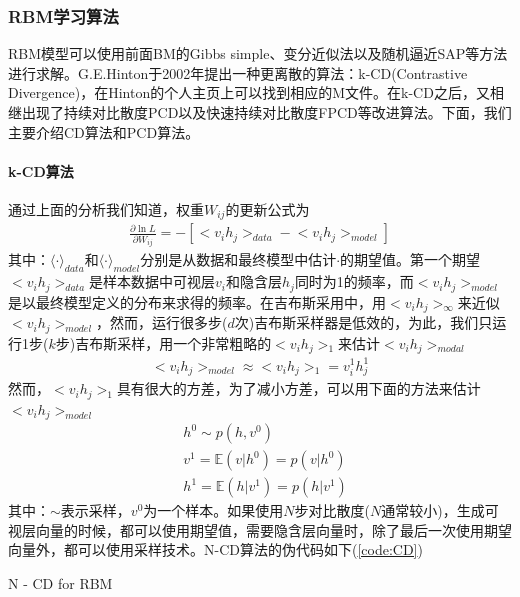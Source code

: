 {        \subsubsection{RBM学习算法}
            \par
            RBM模型可以使用前面BM的Gibbs simple、变分近似法以及随机逼近SAP等方法进行求解。G.E.Hinton于2002年提出一种更离散的算法：k-CD(Contrastive Divergence)，在Hinton的个人主页上可以找到相应的M文件。在k-CD之后，又相继出现了持续对比散度PCD以及快速持续对比散度FPCD等改进算法。下面，我们主要介绍CD算法和PCD算法。
            \paragraph{k-CD算法}通过上面的分析我们知道，权重$W_{ij}$的更新公式为
            \begin{align*}
            \frac{\partial \ln L}{\partial W_{ij}} = - \left[ \big< v_ih_j \big>_{data} -\big< v_ih_j \big>_{model}\right]
            \end{align*}
            其中：$\langle \cdot \rangle_{data}$和$\langle \cdot \rangle_{model}$分别是从数据和最终模型中估计$\cdot$的期望值。第一个期望$\big< v_ih_j \big>_{data}$是样本数据中可视层$v_i$和隐含层$h_j$同时为1的频率，而$\big< v_ih_j \big>_{model}$是以最终模型定义的分布来求得的频率。在吉布斯采用中，用$\big< v_ih_j \big>_{\infty}$来近似$\big< v_ih_j \big>_{model}$，然而，运行很多步($d$次)吉布斯采样器是低效的，为此，我们只运行1步($k$步)吉布斯采样，用一个非常粗略的$\big< v_ih_j \big>_{1}$来估计$\big< v_ih_j \big>_{modal}$
            \begin{align*}
            \big< v_ih_j \big>_{model} \approx \big< v_ih_j \big>_{1} = v_i^1h_j^1
            \end{align*}
            然而，$\big< v_ih_j \big>_{1}$具有很大的方差，为了减小方差，可以用下面的方法来估计$\big< v_ih_j \big>_{model}$
            \begin{align*}
            & h^0 \sim p(h,v^0)\\
            & v^1 = \mathbb{E}(v|h^0) = p(v|h^0)\\
            & h^1 = \mathbb{E}(h|v^1) = p(h|v^1)
            \end{align*}
            其中：$\sim$表示采样，$v^0$为一个样本。如果使用$N$步对比散度($N$通常较小)，生成可视层向量的时候，都可以使用期望值，需要隐含层向量时，除了最后一次使用期望向量外，都可以使用采样技术。N-CD算法的伪代码如下(\ref{code:CD})
            \begin{algorithm}[htbp]
                \caption{N - CD for RBM}\label{code:CD}

\end{algorithm}}
